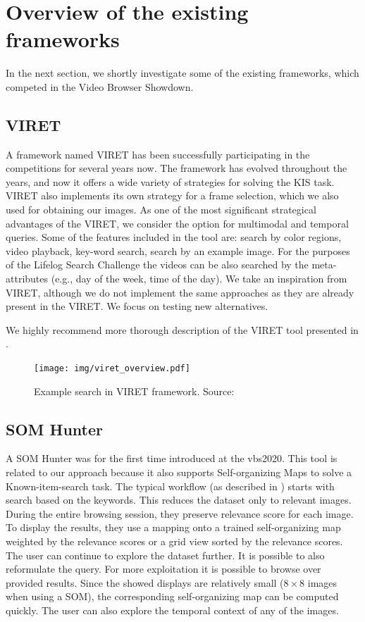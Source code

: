 \section{Overview of the existing frameworks}

In the next section, we shortly investigate some of the existing frameworks, which competed in the Video Browser Showdown. 

\subsection{VIRET}

A framework named VIRET \citep{lokovc2019framework, lokovc2019viret} has been successfully participating in the competitions for several years now. The framework has evolved throughout the years, and now it offers a wide variety of strategies for solving the KIS task. VIRET also implements its own strategy for a frame selection, which we also used for obtaining our images. As one of the most significant strategical advantages of the VIRET, we consider the option for multimodal and temporal queries. Some of the features included in the tool are: search by color regions, video playback, key-word search, search by an example image. For the purposes of the Lifelog Search Challenge \citep{LSC20} the videos can be also searched by the meta-attributes (e.g., day of the week, time of the day). We take an inspiration from VIRET, although we do not implement the same approaches as they are already present in the VIRET. We focus on testing new alternatives.

We highly recommend more thorough description of the VIRET tool presented in \cite{kovalvcik2020viret}.

\begin{figure}
    \centering
    \texttt{[image: img/viret\_overview.pdf]}
    \caption{Example search in VIRET framework. Source: \cite{kovalvcik2020viret}}
    \label{fig:viret}
\end{figure}

\subsection{SOM Hunter}

A SOM Hunter was for the first time introduced at the \acrshort{vbs}2020. This tool is related to our approach because it also supports Self-organizing Maps to solve a Known-item-search task. The typical workflow (as described in \cite{kratochvil2020som}) starts with search based on the keywords. This reduces the dataset only to relevant images. During the entire browsing session, they preserve relevance score for each image. To display the results, they use a mapping onto a trained self-organizing map weighted by the relevance scores or a grid view sorted by the relevance scores. The user can continue to explore the dataset further. It is possible to also reformulate the query. For more exploitation it is possible to browse over provided results. Since the showed displays are relatively small ($8\times8$ images when using a SOM), the corresponding self-organizing map can be computed quickly. The user can also explore the temporal context of any of the images.


